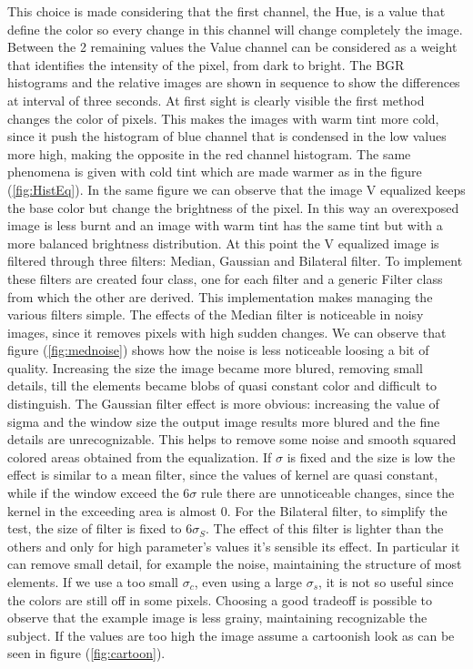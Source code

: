 \documentclass[11pt,a4paper]{article}
\newcommand{\cc}{\fontfamily{txtt}\selectfont}
\begin{document}
This choice is made considering that the first channel, the Hue, is a value that define the color so every change in this channel will change completely the image.
Between the 2 remaining values the Value channel can be considered as a weight that identifies the intensity of the pixel, from dark to bright. \newline
The BGR histograms and the relative images are shown in sequence to show the differences at interval of three seconds.\newline
At first sight is clearly visible the first method changes the color of pixels.
This makes the images with warm tint more cold, since it push the histogram of blue channel that is condensed in the low values more high, making the opposite in the red channel histogram.
The same phenomena is given with cold tint which are made warmer as in the figure (\ref{fig:HistEq}).
In the same figure we can observe that the image V equalized keeps the base color but change the brightness of the pixel.
In this way an overexposed image is less burnt and an image with warm tint has the same tint but with a more balanced brightness distribution.
\newline
At this point the V equalized image is filtered through three filters: Median, Gaussian and Bilateral filter.
To implement these filters are created four class, one for each filter and a generic {\cc Filter} class from which the other are derived.
This implementation makes managing the various filters simple.\newline
The effects of the Median filter is noticeable in noisy images, since it removes pixels with high sudden changes.
We can observe that figure (\ref{fig:mednoise}) shows how the noise is less noticeable loosing a bit of quality.
Increasing the size the image became more blured, removing small details, till the elements became blobs of quasi constant color and difficult to distinguish.\newline
The Gaussian filter effect is more obvious: increasing the value of sigma and the window size the output image results more blured and the fine details are unrecognizable.
This helps to remove some noise and smooth squared colored areas obtained from the equalization.
If $\sigma$ is fixed and the size is low the effect is similar to a mean filter, since the values of kernel are quasi constant, while if the window exceed the 6$\sigma$ rule there are unnoticeable changes, since the kernel in the exceeding area is almost 0.\newline
For the Bilateral filter, to simplify the test, the size of filter is fixed to $6\sigma_{S}$.
The effect of this filter is lighter than the others and only for high parameter's values it's sensible its effect.
In particular it can remove small detail, for example the noise, maintaining the structure of most elements.
If we use a too small $\sigma_c$, even using a large $\sigma_s$, it is not so useful since the colors are still off in some pixels.
Choosing a good tradeoff is possible to observe that the example image is less grainy, maintaining recognizable the subject.
If the values are too high the image assume a cartoonish look as can be seen in figure (\ref{fig:cartoon}).
\end{document}
